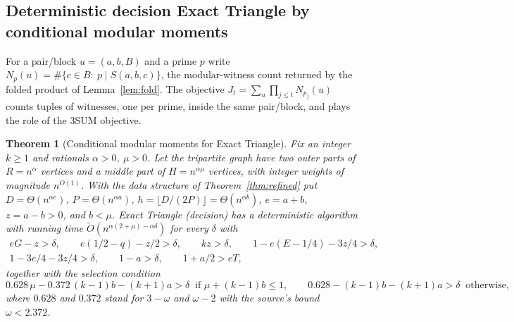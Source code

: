 \documentclass[11pt]{article}
\newtheorem{theorem}{Theorem}
\newcommand{\softO}{\widetilde O}
\begin{document}
\subsection*{Deterministic decision Exact Triangle by conditional modular moments}
For a pair/block $u=(a,b,B)$ and a prime $p$ write
$N_p(u)=\#\{c\in B:\ p\mid S(a,b,c)\}$, the modular-witness count returned by
the folded product of Lemma~\ref{lem:fold}. The objective
$J_t=\sum_u\prod_{j\le t}N_{p_j}(u)$ counts tuples of witnesses, one per
prime, inside the same pair/block, and plays the role of the 3SUM objective.

\begin{theorem}[Conditional modular moments for Exact Triangle]
\label{thm:moment-et}
Fix an integer $k\ge1$ and rationals $\alpha>0$, $\mu>0$. Let the tripartite
graph have two outer parts of $R=n^\alpha$ vertices and a middle part of
$H=n^{\alpha\mu}$ vertices, with integer weights of magnitude $n^{O(1)}$.
With the data structure of Theorem~\ref{thm:refined} put $D=\Theta(n^{\alpha e})$,
$P=\Theta(n^{\alpha a})$, $h=\lfloor D/(2P)\rfloor=\Theta(n^{\alpha b})$,
$e=a+b$, $z=a-b>0$, and $b<\mu$. Exact Triangle (decision) has a deterministic
algorithm with running time $\softO(n^{\alpha(2+\mu)-\alpha\delta})$ for every
$\delta$ with
\begin{gather*}
eG-z>\delta,\qquad e(1/2-q)-z/2>\delta,\qquad kz>\delta,\qquad
1-e(E-1/4)-3z/4>\delta,\\
1-3e/4-3z/4>\delta,\qquad 1-a>\delta,\qquad 1+a/2>eT,
\end{gather*}
together with the selection condition
\[
0.628\,\mu-0.372\,(k-1)b-(k+1)a>\delta\ \text{ if }\mu+(k-1)b\le1,
\qquad
0.628-(k-1)b-(k+1)a>\delta\ \text{ otherwise},
\]
where $0.628$ and $0.372$ stand for $3-\omega$ and $\omega-2$ with the
source's bound $\omega<2.372$.
\end{theorem}
\end{document}
